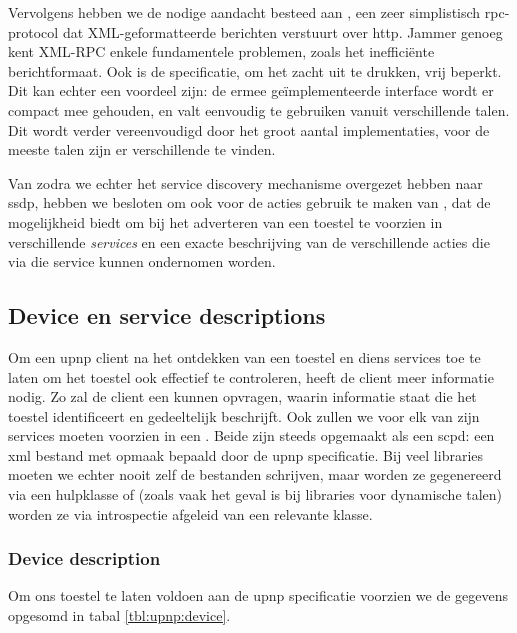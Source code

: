 Vervolgens hebben we de nodige aandacht besteed aan , een zeer simplistisch \ac{rpc}-protocol dat XML-geformatteerde berichten verstuurt over \ac{http}. Jammer genoeg kent XML-RPC enkele fundamentele problemen, zoals het inefficiënte berichtformaat. Ook is de specificatie, om het zacht uit te drukken, vrij beperkt. Dit kan echter een voordeel zijn: de ermee geïmplementeerde interface wordt er compact mee gehouden, en valt eenvoudig te gebruiken vanuit verschillende talen. Dit wordt verder vereenvoudigd door het groot aantal implementaties, voor de meeste talen zijn er verschillende te vinden.

Van zodra we echter het service discovery mechanisme overgezet hebben naar \ac{ssdp}, hebben we besloten om ook voor de acties gebruik te maken van , dat de mogelijkheid biedt om bij het adverteren van een toestel te voorzien in verschillende \emph{services} en een exacte beschrijving van de verschillende acties die via die service kunnen ondernomen worden.

\subsection{Device en service descriptions}

Om een \ac{upnp} client na het ontdekken van een toestel en diens services toe te laten om het toestel ook effectief te controleren, heeft de client meer informatie nodig. Zo zal de client een  kunnen opvragen, waarin informatie staat die het toestel identificeert en gedeeltelijk beschrijft. Ook zullen we voor elk van zijn services moeten voorzien in een . Beide zijn steeds opgemaakt als een \ac{scpd}: een \ac{xml} bestand met opmaak bepaald door de \ac{upnp} specificatie. Bij veel libraries moeten we echter nooit zelf de bestanden schrijven, maar worden ze gegenereerd via een hulpklasse of (zoals vaak het geval is bij libraries voor dynamische talen) worden ze via introspectie afgeleid van een relevante klasse.

\subsubsection{Device description}

Om ons toestel te laten voldoen aan de \ac{upnp} specificatie voorzien we de gegevens opgesomd in tabal \ref{tbl:upnp:device}.

